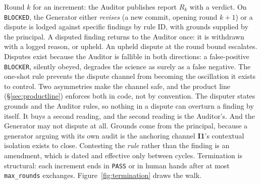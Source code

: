 \documentclass[11pt]{article}
\newcommand{\invariant}[1]{\textbf{I#1}}
\begin{document}
Round $k$ for an increment: the Auditor publishes report $R_k$ with a verdict. On \texttt{BLOCKED}, the Generator either \emph{revises} (a new commit, opening round $k{+}1$) or a dispute is lodged against specific findings by rule ID, with grounds supplied by the principal. A disputed finding returns to the Auditor once: it is withdrawn with a logged reason, or upheld. An upheld dispute at the round bound escalates. Disputes exist because the Auditor is fallible in both directions: a false-positive \texttt{BLOCKER}, silently obeyed, degrades the science as surely as a false negative. The one-shot rule prevents the dispute channel from becoming the oscillation it exists to control. Two asymmetries make the channel safe, and the product line (\S\ref{sec:productline}) enforces both in code, not by convention. The disputer states grounds and the Auditor rules, so nothing in a dispute can overturn a finding by itself. It buys a second reading, and the second reading is the Auditor's. And the Generator may not dispute at all. Grounds come from the principal, because a generator arguing with its own audit is the anchoring channel \invariant{1}'s contextual isolation exists to close. Contesting the \emph{rule} rather than the finding is an amendment, which is dated and effective only between cycles. Termination is structural: each increment ends in \texttt{PASS} or in human hands after at most \texttt{max\_rounds} exchanges. Figure~\ref{fig:termination} draws the walk.
\end{document}
